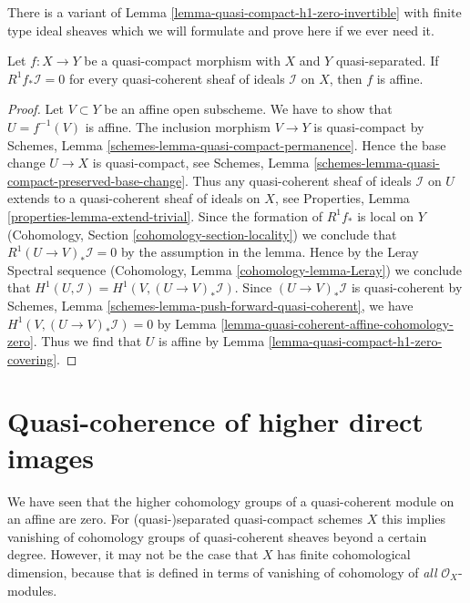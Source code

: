 \noindent
There is a variant of Lemma \ref{lemma-quasi-compact-h1-zero-invertible}
with finite type ideal sheaves which we will formulate and prove here if
we ever need it.

\begin{lemma}
\label{lemma-criterion-affine-morphism}
Let $f : X \to Y$ be a quasi-compact morphism with $X$ and $Y$ quasi-separated.
If $R^1f_*\mathcal{I} = 0$ for every quasi-coherent sheaf of ideals
$\mathcal{I}$ on $X$, then $f$ is affine.
\end{lemma}

\begin{proof}
Let $V \subset Y$ be an affine open subscheme. We have to show that
$U = f^{-1}(V)$ is affine. The inclusion morphism $V \to Y$ is quasi-compact
by Schemes, Lemma \ref{schemes-lemma-quasi-compact-permanence}.
Hence the base change $U \to X$ is quasi-compact, see
Schemes, Lemma \ref{schemes-lemma-quasi-compact-preserved-base-change}.
Thus any quasi-coherent sheaf of ideals $\mathcal{I}$ on $U$
extends to a quasi-coherent sheaf of ideals on $X$, see
Properties, Lemma \ref{properties-lemma-extend-trivial}.
Since the formation of $R^1f_*$ is local on $Y$
(Cohomology, Section \ref{cohomology-section-locality})
we conclude that $R^1(U \to V)_*\mathcal{I} = 0$ by the assumption
in the lemma. Hence by the Leray Spectral sequence
(Cohomology, Lemma \ref{cohomology-lemma-Leray})
we conclude that $H^1(U, \mathcal{I}) = H^1(V, (U \to V)_*\mathcal{I})$.
Since $(U \to V)_*\mathcal{I}$ is quasi-coherent by
Schemes, Lemma \ref{schemes-lemma-push-forward-quasi-coherent}, we have
$H^1(V, (U \to V)_*\mathcal{I}) = 0$ by
Lemma \ref{lemma-quasi-coherent-affine-cohomology-zero}.
Thus we find that $U$ is affine by
Lemma \ref{lemma-quasi-compact-h1-zero-covering}.
\end{proof}















\section{Quasi-coherence of higher direct images}
\label{section-quasi-coherence}

\noindent
We have seen that the higher cohomology groups of a quasi-coherent module on
an affine are zero. For (quasi-)separated quasi-compact schemes $X$ this implies
vanishing of cohomology groups of quasi-coherent sheaves beyond a certain
degree. However, it may not be the case that $X$ has finite cohomological
dimension, because that is defined in terms of vanishing of cohomology
of {\it all} $\mathcal{O}_X$-modules.

